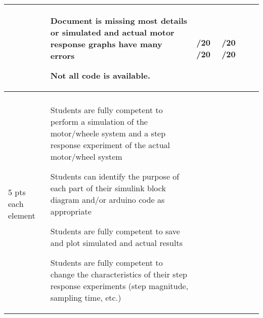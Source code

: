 \documentclass[11pt,landscape]{amsart}
\begin{document}
\begin{tabular}{llllcc}
&

\begin{minipage}{2.5in}\begin{list}{}{\leftmargin=1em}
\item Document is missing most details or simulated and actual motor response graphs have many errors
\item Not all code is available.
\end{list}
\end{minipage}
& \begin{minipage}{0.4in}\underline{\hspace{.25in}}/20  \underline{\hspace{.25in}}/20\end{minipage} 
& \begin{minipage}{0.4in}\underline{\hspace{.25in}}/20  \underline{\hspace{.25in}}/20\end{minipage} 
\\[2pt] \midrule

\begin{sideways}\hspace{-.35in}\begin{minipage}{.7in}\begin{center}\textbf{Demonstration} \\ 5 pts each element\end{center}\end{minipage}\end{sideways}  &


\begin{minipage}{2.5in}\begin{list}{}{\leftmargin=1em}
\item Students are fully competent to perform a simulation of the motor/wheele system and a step response experiment of the actual motor/wheel system
\item Students can identify the purpose of each part of their simulink block diagram and/or arduino code as appropriate
\item Students are fully competent to save and plot simulated and actual results
\item Students are fully competent to  change the characteristics of their step response experiments (step magnitude, sampling time, etc.) 
\end{list}
\end{minipage}
\vspace{.1in}
 &


\end{tabular}
\end{document}
